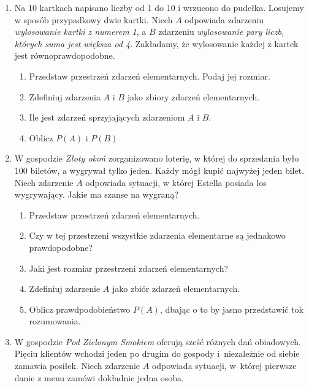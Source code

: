 \documentclass{mwart}
\newcommand{\ans}[1]{}
\newcommand{\ans}[1]{\emph{Odpowiedź:} #1}
\begin{document}
\begin{enumerate}
\item Na 10 kartkach napisano liczby od 1 do 10 i wrzucono do pudełka. Losujemy w sposób przypadkowy dwie kartki. Niech $A$ odpowiada zdarzeniu \emph{wylosowanie kartki z numerem 1}, a $B$ zdarzeniu \emph{wylosowanie pary liczb, których suma jest większa od 4}. Zakładamy, że wylosowanie każdej z kartek jest równoprawdopodobne.
\begin{enumerate}
\item Przedstaw przestrzeń zdarzeń elementarnych. Podaj jej rozmiar. \ans{$\Omega=\{\omega_{\{i,j\}}|i,j\in\{1,\ldots,10\} \land i\neq j\}, \left|\Omega\right|={10 \choose 2}=45$}
\item Zdefiniuj zdarzenia $A$ i $B$ jako zbiory zdarzeń elementarnych. \ans{$A=\{\omega_{\{i,j\}}\in\Omega|i=1 \lor j=1\}$, $B=\{\omega_{\{i,j\}}\in\Omega|i+j>4\}$}
\item Ile jest zdarzeń sprzyjających zdarzeniom $A$ i $B$. \ans{$\left|A\right|=9$, $\left|B\right|=45-4=41$}
\item Oblicz $P(A)$ i $P(B)$ \ans{$P(A)=\frac{9}{45}, P(B)=\frac{41}{45}$}
\end{enumerate}
\item W gospodzie \emph{Złoty okoń} zorganizowano loterię, w której do sprzedania było 100 biletów, a wygrywał tylko jeden. Każdy mógł kupić najwyżej jeden bilet. Niech zdarzenie $A$ odpowiada sytuacji, w której Estella posiada los wygrywający. Jakie ma szanse na wygraną?
\begin{enumerate}%
\item Przedstaw przestrzeń zdarzeń elementarnych. \ans{$\Omega=\{\omega_n|n=1,2,\ldots,100\}$}%
\item Czy w tej przestrzeni wszystkie zdarzenia elementarne są jednakowo prawdopodobne? \ans{Tak}%
\item Jaki jest rozmiar przestrzeni zdarzeń elementarnych? \ans{$\left|\Omega\right|=100$}%
\item Zdefiniuj zdarzenie $A$ jako zbiór zdarzeń elementarnych. \ans{$A=\{\omega_1$\}}%
\item Oblicz prawdpodobieństwo $P(A)$, dbając o to by jasno przedstawić tok rozumowania. \ans{$P(A)=\frac{1}{100}$}%
\end{enumerate}%
\item W gospodzie \emph{Pod Zielonym Smokiem} oferują sześć różnych dań obiadowych. Pięciu klientów wchodzi jeden po drugim do gospody
i~niezależnie od siebie zamawia posiłek. Niech zdarzenie $A$ odpowiada sytuacji, w~której pierwsze danie z menu zamówi dokładnie jedna osoba.%

\end{enumerate}
\end{document}
